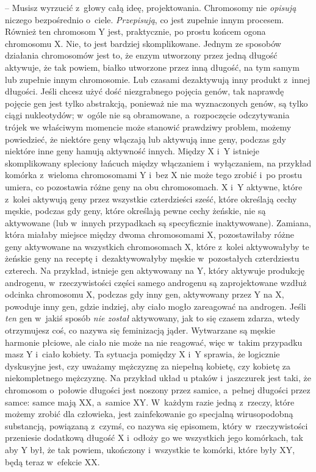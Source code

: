\documentclass[oneside,polish,11pt,rmheadings]{mwbk}
\begin{document}
-- Musisz wyrzucić z~głowy całą ideę, projektowania. Chromosomy nie  \textit{opisują }niczego bezpośrednio o~ciele. \textit{Przepisują}, co jest zupełnie innym procesem. Również ten chromosom Y jest, praktycznie, po prostu końcem ogona chromosomu X. Nie, to jest bardziej skomplikowane. Jednym ze sposobów działania chromosomów jest to, że enzym utworzony przez jedną długość aktywuje, że tak powiem, białko utworzone przez inną długość, na tym samym lub zupełnie innym chromosomie. Lub czasami dezaktywują inny produkt z~innej długości. Jeśli chcesz użyć dość niezgrabnego pojęcia genów, tak naprawdę pojęcie gen jest tylko abstrakcją, ponieważ nie ma wyznaczonych genów, są tylko ciągi nukleotydów; w~ogóle nie są obramowane, a~rozpoczęcie odczytywania trójek we właściwym momencie może stanowić prawdziwy problem, możemy powiedzieć, że niektóre geny włączają lub aktywują inne geny, podczas gdy niektóre inne geny hamują aktywność innych. Między X i~Y istnieje skomplikowany spleciony łańcuch między włączaniem i~wyłączaniem, na przykład komórka z~wieloma chromosomami Y i~bez X nie może tego zrobić i~po prostu umiera, co pozostawia różne geny na obu chromosomach. X i~Y aktywne, które z~kolei aktywują geny przez wszystkie czterdzieści sześć, które określają cechy męskie, podczas gdy geny, które określają pewne cechy żeńskie, nie są aktywowane (lub w~innych przypadkach są specyficznie inaktywowane). Zamiana, która miałaby miejsce między dwoma chromosomami X, pozostawiłaby różne geny aktywowane na wszystkich chromosomach X, które z~kolei aktywowałyby te żeńskie geny na receptę i~dezaktywowałyby męskie w~pozostałych czterdziestu czterech. Na przykład, istnieje gen aktywowany na Y, który aktywuje produkcję androgenu, w~rzeczywistości części samego androgenu są zaprojektowane wzdłuż odcinka chromosomu X, podczas gdy inny gen, aktywowany przez Y na X, powoduje inny gen, gdzie indziej, aby ciało mogło zareagować na androgen. Jeśli \textit{ten }gen w~jakiś sposób \textit{nie został }aktywowany, jak to się czasem zdarza, wtedy otrzymujesz coś, co nazywa się feminizacją jąder. Wytwarzane są męskie harmonie płciowe, ale ciało nie może na nie reagować, więc w~takim przypadku masz Y i~ciało kobiety. Ta sytuacja pomiędzy X i~Y sprawia, że logicznie dyskusyjne jest, czy uważamy mężczyznę za niepełną kobietę, czy kobietę za niekompletnego mężczyznę. Na przykład układ u ptaków i~jaszczurek jest taki, że chromosom o~połowie długości jest noszony przez samice, a~pełnej długości przez samce: samce mają XX, a~samice XY. W~każdym razie jedną z~rzeczy, które możemy zrobić dla człowieka, jest zainfekowanie go specjalną wirusopodobną substancją, powiązaną z~czymś, co nazywa się episomem, który w~rzeczywistości przeniesie dodatkową długość X i~odłoży go we wszystkich jego komórkach, tak aby Y był, że tak powiem, ukończony i~wszystkie te komórki, które były XY, będą teraz w~efekcie XX. 
\end{document}
